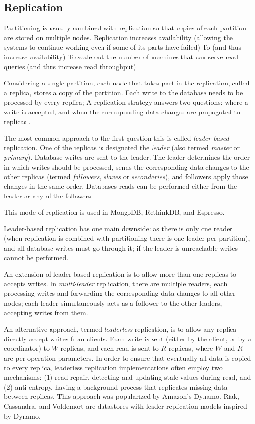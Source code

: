 \subsection{Replication}

Partitioning is usually combined with replication so that copies of each partition are stored on multiple nodes.
Replication increases availability (allowing the systems to continue working even if some of its parts have failed)
To  (and thus increase availability)
To scale out the number of machines that can serve read queries (and thus increase read throughput)

Considering a single partition, each node that takes part in the replication, called a replica, stores a copy of the
partition.
Each write to the database needs to be processed by every replica;
A replication strategy answers two questions: where a write is accepted, and when the corresponding data changes are
propagated to replicas \cite{gray:replication}.

\bigskip
\noindent
The most common approach to the first question this is called \textit{leader-based} replication.
One of the replicas is designated the \textit{leader} (also termed \textit{master} or \textit{primary}).
Database writes are sent to the leader.
The leader determines the order in which writes should be processed, sends the corresponding data changes to the other
replicas (termed \textit{followers}, \textit{slaves} or \textit{secondaries}),
and followers apply those changes in the same order.
Databases reads can be performed either from the leader or any of the followers.

This mode of replication is used in MongoDB, RethinkDB, and Espresso.

Leader-based replication has one main downside: as there is only one reader (when replication is combined with partitioning there is one leader per partition),
and all database writes must go through it; if the leader is unreachable writes cannot be performed.

An extension of leader-based replication is to allow more than one replicas to accepts writes.
In \textit{multi-leader} replication, there are multiple readers, each processing writes and forwarding the corresponding data changes to all other nodes;
each leader simultaneously acts as a follower to the other leaders, accepting writes from them.

An alternative approach, termed \textit{leaderless} replication, is to allow any replica directly accept writes from clients.
Each write is sent (either by the client, or by a coordinator) to $W$ replicas, and each read is sent to $R$ replicas,
where $W$ and $R$ are per-operation parameters.
In order to ensure that eventually all data is copied to every replica, leaderless replication implementations often employ two mechanisms:
(1) read repair, detecting and updating stale values during read, and (2) anti-entropy, having a background process that replicates missing data between replicas.
This approach was popularized by Amazon's Dynamo.
Riak, Cassandra, and Voldemort are datastores with leader replication models inspired by Dynamo.

